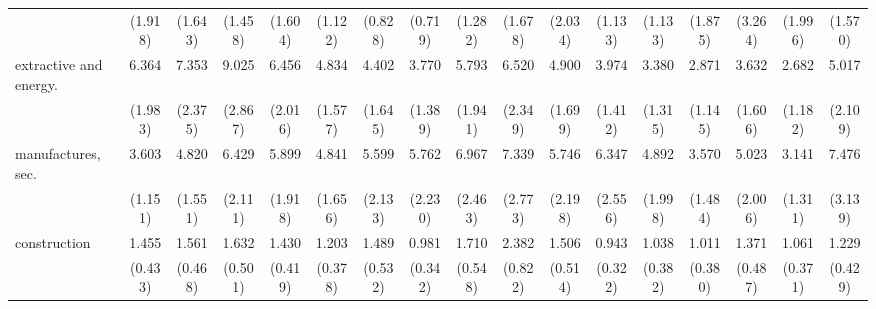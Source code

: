 {\begin{tabular}{l*{16}{c}}
                    &     (1.918)         &     (1.643)         &     (1.458)         &     (1.604)         &     (1.122)         &     (0.828)         &     (0.719)         &     (1.282)         &     (1.678)         &     (2.034)         &     (1.133)         &     (1.133)         &     (1.875)         &     (3.264)         &     (1.996)         &     (1.570)         \\
[1em]
extractive and energy.&       6.364\sym{***}&       7.353\sym{***}&       9.025\sym{***}&       6.456\sym{***}&       4.834\sym{***}&       4.402\sym{***}&       3.770\sym{***}&       5.793\sym{***}&       6.520\sym{***}&       4.900\sym{***}&       3.974\sym{***}&       3.380\sym{**} &       2.871\sym{**} &       3.632\sym{**} &       2.682\sym{*}  &       5.017\sym{***}\\
                    &     (1.983)         &     (2.375)         &     (2.867)         &     (2.016)         &     (1.577)         &     (1.645)         &     (1.389)         &     (1.941)         &     (2.349)         &     (1.699)         &     (1.412)         &     (1.315)         &     (1.145)         &     (1.606)         &     (1.182)         &     (2.109)         \\
[1em]
manufactures, sec.  &       3.603\sym{***}&       4.820\sym{***}&       6.429\sym{***}&       5.899\sym{***}&       4.841\sym{***}&       5.599\sym{***}&       5.762\sym{***}&       6.967\sym{***}&       7.339\sym{***}&       5.746\sym{***}&       6.347\sym{***}&       4.892\sym{***}&       3.570\sym{**} &       5.023\sym{***}&       3.141\sym{**} &       7.476\sym{***}\\
                    &     (1.151)         &     (1.551)         &     (2.111)         &     (1.918)         &     (1.656)         &     (2.133)         &     (2.230)         &     (2.463)         &     (2.773)         &     (2.198)         &     (2.556)         &     (1.998)         &     (1.484)         &     (2.006)         &     (1.311)         &     (3.139)         \\
[1em]
construction        &       1.455         &       1.561         &       1.632         &       1.430         &       1.203         &       1.489         &       0.981         &       1.710         &       2.382\sym{*}  &       1.506         &       0.943         &       1.038         &       1.011         &       1.371         &       1.061         &       1.229         \\
                    &     (0.433)         &     (0.468)         &     (0.501)         &     (0.419)         &     (0.378)         &     (0.532)         &     (0.342)         &     (0.548)         &     (0.822)         &     (0.514)         &     (0.322)         &     (0.382)         &     (0.380)         &     (0.487)         &     (0.371)         &     (0.429)         \\

\end{tabular}}
